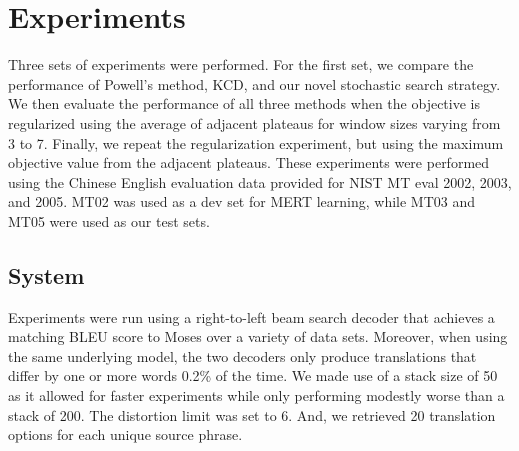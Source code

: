 \documentclass[11pt]{article}
\begin{document}

\section{Experiments}

Three sets of experiments were performed. For the first set, we compare the performance of Powell's method, KCD, and our novel stochastic search strategy. We then evaluate the performance of all three methods when the objective is regularized using the average of adjacent plateaus for window sizes varying from 3 to 7. Finally, we repeat the regularization experiment, but using the maximum objective value from the adjacent plateaus. These experiments were performed using the Chinese English evaluation data provided for NIST MT eval 2002, 2003, and 2005. MT02 was used as a dev set for MERT learning, while MT03 and MT05 were used as our test sets. 

\subsection{System}

Experiments were run using a right-to-left beam search decoder that achieves a matching BLEU score to Moses \cite{koehn2007} over a variety of data sets. Moreover, when using the same underlying model, the two decoders only produce translations that differ by one or more words 0.2\% of the time. We made use of a stack size of 50 as it allowed for faster experiments while only performing modestly worse than a stack of 200. The distortion limit was set to 6. And, we retrieved 20 translation options for each unique source phrase.
\end{document}
